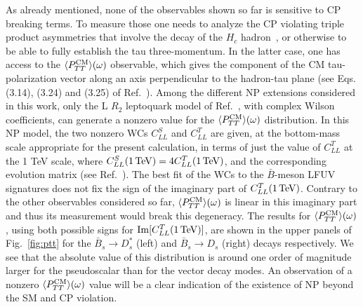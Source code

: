 \documentclass[aps,superscriptaddress,showpacs,nofootinbib,11pt]{revtex4-1}
\begin{document}
As already mentioned, none of the observables shown so far is sensitive to CP breaking terms. 
To measure those one needs to analyze the CP violating triple product asymmetries that  involve the decay of the $H_c$ hadron~\cite{Duraisamy:2013pia,  Duraisamy:2014sna, Ligeti:2016npd, Bhattacharya:2020lfm,Boer:2019zmp,Hu:2020axt}, or otherwise to be able to fully establish the tau three-momentum. In the latter case, one has access to the    
$\langle P^{\rm CM}_{TT}\rangle(\omega)$ observable,  which gives the component of the CM tau-polarization vector 
along an axis perpendicular to the hadron-tau plane (see Eqs. (3.14), (3.24) and (3.25) of Ref.~\cite{Penalva:2021gef}). 
Among the different NP extensions considered in this work, only the L $R_2$ leptoquark model of Ref.~\cite{Shi:2019gxi}, with complex Wilson coefficients,  can generate a nonzero value for the $\langle P^{\rm CM}_{TT}\rangle(\omega)$ distribution.  In this NP model, the two nonzero WCs $C^S_{LL}$ and $C^T_{LL}$ are given, at the bottom-mass scale appropriate for the present calculation, in terms of just the value of $ C^T_{LL}$ at the  1 TeV scale, where
$C^S_{LL}(1\,{\rm TeV})= 4C^T_{LL}(1\,{\rm TeV})$, and the corresponding evolution matrix (see Ref.~\cite{Shi:2019gxi}). 
The best fit of the WCs to the $\bar B$-meson LFUV signatures does not fix the sign of the imaginary part of $C^T_{LL}(1\,{\rm TeV})$. 
Contrary to the other observables considered so far, $\langle P^{\rm CM}_{TT}\rangle(\omega)$ is linear in this imaginary part
and thus its measurement would break this degeneracy. The results for $\langle P^{\rm CM}_{TT}\rangle(\omega)$, 
using both possible signs for ${\rm Im} [C^T_{LL} (1\, {\rm TeV})]$, are shown in the upper  panels of Fig.~\ref{fig:ptt} for the $\bar B_s\to D^*_s$ (left) and $\bar B_s\to D_s$ (right) decays respectively. We see that the absolute value of this distribution is around one order of magnitude larger for the pseudoscalar than for the vector decay modes. An observation of a nonzero $\langle P^{\rm CM}_{TT}\rangle(\omega)$ value will be a clear indication of the existence of NP beyond the SM and CP violation.
\end{document}
